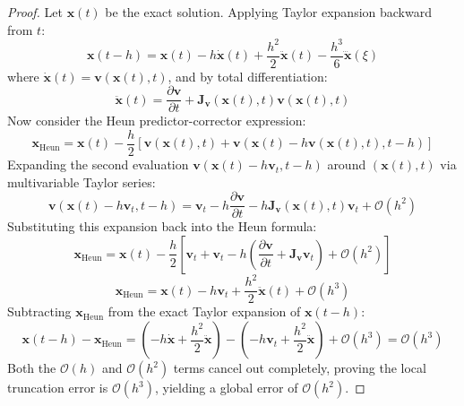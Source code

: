 \documentclass[11pt,a4paper]{article}
\theoremstyle{definition}
\begin{document}
\begin{proof}
Let $\mathbf{x}(t)$ be the exact solution. Applying Taylor expansion backward from $t$:
{\boldmath
\begin{equation}
\mathbf{x}(t - h) = \mathbf{x}(t) - h \dot{\mathbf{x}}(t) + \frac{h^2}{2} \ddot{\mathbf{x}}(t) - \frac{h^3}{6} \dddot{\mathbf{x}}(\xi)
\end{equation}
}
where $\dot{\mathbf{x}}(t) = \mathbf{v}(\mathbf{x}(t), t)$, and by total differentiation:
{\boldmath
\begin{equation}
\ddot{\mathbf{x}}(t) = \frac{\partial \mathbf{v}}{\partial t} + \mathbf{J}_\mathbf{v}(\mathbf{x}(t), t) \mathbf{v}(\mathbf{x}(t), t)
\end{equation}
}
Now consider the Heun predictor-corrector expression:
{\boldmath
\begin{equation}
\mathbf{x}_{\text{Heun}} = \mathbf{x}(t) - \frac{h}{2} \left[ \mathbf{v}(\mathbf{x}(t), t) + \mathbf{v}(\mathbf{x}(t) - h\mathbf{v}(\mathbf{x}(t), t), t - h) \right]
\end{equation}
}
Expanding the second evaluation $\mathbf{v}(\mathbf{x}(t) - h\mathbf{v}_t, t - h)$ around $(\mathbf{x}(t), t)$ via multivariable Taylor series:
{\boldmath
\begin{equation}
\mathbf{v}(\mathbf{x}(t) - h\mathbf{v}_t, t - h) = \mathbf{v}_t - h \frac{\partial \mathbf{v}}{\partial t} - h \mathbf{J}_\mathbf{v}(\mathbf{x}(t), t) \mathbf{v}_t + \mathcal{O}(h^2)
\end{equation}
}
Substituting this expansion back into the Heun formula:
{\boldmath
\begin{equation}
\mathbf{x}_{\text{Heun}} = \mathbf{x}(t) - \frac{h}{2} \left[ \mathbf{v}_t + \mathbf{v}_t - h \left( \frac{\partial \mathbf{v}}{\partial t} + \mathbf{J}_\mathbf{v} \mathbf{v}_t \right) + \mathcal{O}(h^2) \right]
\end{equation}
}
{\boldmath
\begin{equation}
\mathbf{x}_{\text{Heun}} = \mathbf{x}(t) - h \mathbf{v}_t + \frac{h^2}{2} \ddot{\mathbf{x}}(t) + \mathcal{O}(h^3)
\end{equation}
}
Subtracting $\mathbf{x}_{\text{Heun}}$ from the exact Taylor expansion of $\mathbf{x}(t - h)$:
{\boldmath
\begin{equation}
\mathbf{x}(t - h) - \mathbf{x}_{\text{Heun}} = \left( -h\dot{\mathbf{x}} + \frac{h^2}{2}\ddot{\mathbf{x}} \right) - \left( -h\mathbf{v}_t + \frac{h^2}{2}\ddot{\mathbf{x}} \right) + \mathcal{O}(h^3) = \mathcal{O}(h^3)
\end{equation}
}
Both the $\mathcal{O}(h)$ and $\mathcal{O}(h^2)$ terms cancel out completely, proving the local truncation error is $\mathcal{O}(h^3)$, yielding a global error of $\mathcal{O}(h^2)$.
\end{proof}
\end{document}
